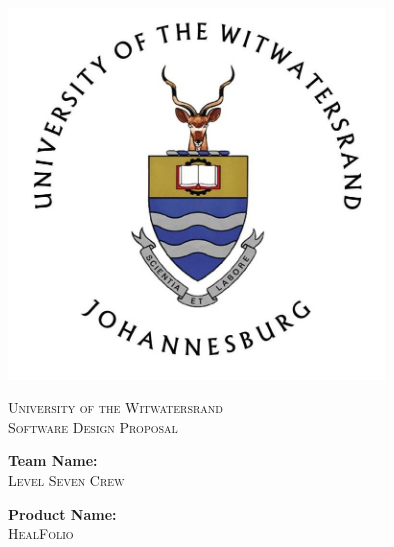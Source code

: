 \documentclass[a4paper]{article}
\begin{document}
\begin{titlepage}

\centering

\vfill

\includegraphics[width=10cm]{Wits-logo1.jpg}

\vskip 0.1cm

\center 

\textsc{\LARGE University of the Witwatersrand}\\[0.5cm] 

\textsc{\Large Software Design Proposal} \\[0.5cm] 

\begin{minipage}{0.4\textwidth}

\begin{center} \large

\textbf{Team Name:} \\[0.3cm]

\textsc{Level Seven Crew} \\[0.3cm]

\end{center}

\begin{center} \large

\textbf{Product Name:} \\[0.3cm]

\textsc{HealFolio} \\[0.3cm]

\end{center}

\begin{flushleft} \large


\end{flushleft}
\end{minipage}
\end{titlepage}
\end{document}
